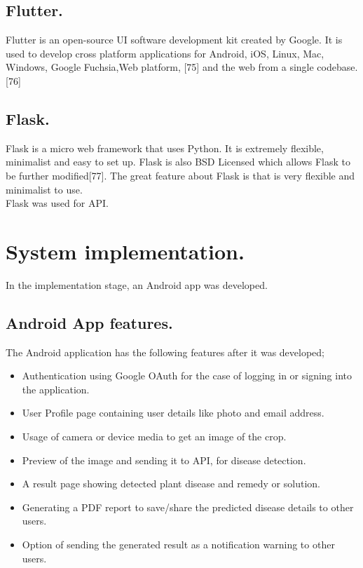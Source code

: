 \documentclass[11pt]{report}
\begin{document}
\subsection{Flutter.}
Flutter is an open-source UI software development kit created by Google. It is used to develop cross platform applications for Android, iOS, Linux, Mac, Windows, Google Fuchsia,Web platform, [75] and the web from a single codebase.[76] \\

\subsection{Flask.}
Flask is a micro web framework that uses Python. It is extremely flexible, minimalist and easy to set up.
Flask is also BSD Licensed which allows Flask to be further modified[77]. The great feature about Flask is
that is very flexible and minimalist to use.\\
Flask was used for API.\\




\section{System implementation.}
In the implementation stage, an Android app was developed.\\

\subsection{Android App features.}
The Android application has the following features after it was developed; \\
\begin{itemize}
	\item Authentication using Google OAuth for the case of logging in or signing into the application.\\
	\item User Profile page containing user details like photo and email address.\\
	\item Usage of camera or device media to get an image of the crop.\\
	\item Preview of the image and sending it to API, for disease detection.\\
	\item A result page showing detected plant disease and remedy or solution.\\
	\item Generating a PDF report to save/share the predicted disease details to other users.\\
	\item Option of sending the generated result as a notification warning to other users.\\
	
	
\end{itemize}
\end{document}
